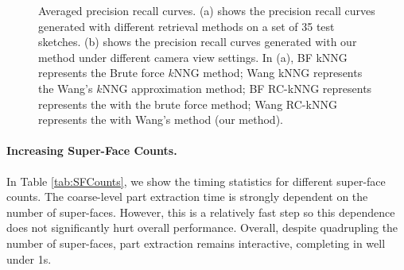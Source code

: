 \begin{figure}\centering
{}
\caption{Averaged precision recall curves. (a) shows the precision recall curves generated with different retrieval methods on a set of 35 test sketches.
(b) shows the precision recall curves generated with our method under different camera view settings.
In (a), BF kNNG represents the Brute force $k$NNG method; Wang kNNG represents the Wang's $k$NNG approximation method;
BF RC-kNNG represents represents the {\RCKNNG} with the brute force method;
Wang RC-kNNG represents the {\RCKNNG} with Wang's method (our method).}\label{fig:PreRecCurve}
\end{figure}

\paragraph*{Increasing Super-Face Counts.} In Table \ref{tab:SFCounts}, we show the timing statistics for different super-face counts. The coarse-level part extraction time is strongly dependent on the number of super-faces. However, this is a relatively fast step so this dependence does not significantly hurt overall performance. Overall, despite quadrupling the number of super-faces, part extraction remains interactive, completing in well under 1s.

